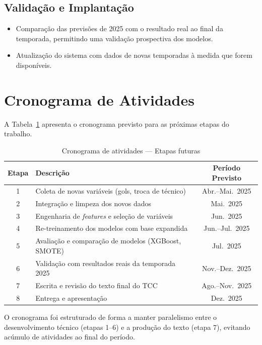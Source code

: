 \subsection{Validação e Implantação}

\begin{itemize}
    \item Comparação das previsões de 2025 com o resultado real ao final da temporada,
          permitindo uma validação prospectiva dos modelos.
    \item Atualização do sistema com dados de novas temporadas à medida que forem disponíveis.
\end{itemize}


\section{Cronograma de Atividades}

A Tabela~\ref{tab:cronograma} apresenta o cronograma previsto para as próximas etapas do trabalho.

\begin{table}[H]
\centering
\caption{Cronograma de atividades — Etapas futuras}
\label{tab:cronograma}
\begin{tabular}{clc}
\toprule
\textbf{Etapa} & \textbf{Descrição} & \textbf{Período Previsto} \\
\midrule
1 & Coleta de novas variáveis (gols, troca de técnico)    & Abr.--Mai.\ 2025 \\
2 & Integração e limpeza dos novos dados                  & Mai.\ 2025        \\
3 & Engenharia de \textit{features} e seleção de variáveis & Jun.\ 2025       \\
4 & Re-treinamento dos modelos com base expandida          & Jun.--Jul.\ 2025  \\
5 & Avaliação e comparação de modelos (XGBoost, SMOTE)     & Jul.\ 2025        \\
6 & Validação com resultados reais da temporada 2025        & Nov.--Dez.\ 2025  \\
7 & Escrita e revisão do texto final do TCC                & Ago.--Nov.\ 2025  \\
8 & Entrega e apresentação                                 & Dez.\ 2025        \\
\bottomrule
\end{tabular}
\end{table}

\noindent
O cronograma foi estruturado de forma a manter paralelismo entre o desenvolvimento técnico
(etapas 1--6) e a produção do texto (etapa 7), evitando acúmulo de atividades
ao final do período.
